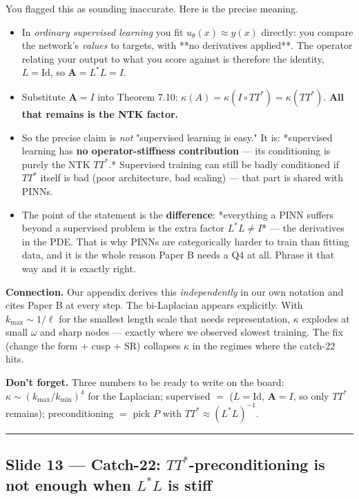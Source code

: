 \documentclass[11pt]{article}
\begin{document}
You flagged this as sounding inaccurate. Here is the precise meaning.

\begin{itemize}
\item In \emph{ordinary supervised learning} you fit $u_\theta(x) \approx y(x)$
directly: you compare the network's \emph{values} to targets, with **no
derivatives applied**. The operator relating your output to what you
score against is therefore the identity, $L = \mathrm{Id}$, so $\mathbf A
  = L^*L = I$.
\item Substitute $\mathbf A = I$ into Theorem 7.10: $\kappa(A) = \kappa(I \circ
  TT^*) = \kappa(TT^*)$. \textbf{All that remains is the NTK factor.}
\item So the precise claim is \emph{not} "supervised learning is easy." It is:
*supervised learning has \textbf{no operator-stiffness contribution} --- its
conditioning is purely the NTK $TT^*$.* Supervised training can still be
badly conditioned if $TT^*$ itself is bad (poor architecture, bad
scaling) --- that part is shared with PINNs.
\item The point of the statement is the \textbf{difference}: *everything a PINN
suffers beyond a supervised problem is the extra factor $L^*L \ne I$* ---
the derivatives in the PDE. That is why PINNs are categorically harder to
train than fitting data, and it is the whole reason Paper B needs a Q4 at
all. Phrase it that way and it is exactly right.
\end{itemize}
\textbf{Connection.} Our appendix derives this \emph{independently} in our own
notation and cites Paper B at every step. The bi-Laplacian appears
explicitly. With $k_{\max} \sim 1/\ell$ for the smallest length scale that
needs representation, $\kappa$ explodes at small $\omega$ and sharp nodes
--- exactly where we observed slowest training. The fix (change the form +
cusp + SR) collapses $\kappa$ in the regimes where the catch-22 hits.

\textbf{Don't forget.} Three numbers to be ready to write on the board: $\kappa
\sim (k_{\max}/k_{\min})^4$ for the Laplacian; supervised $=$ ($L = \mathrm
{Id}$, $\mathbf A = I$, so only $TT^*$ remains); preconditioning $=$ pick
$P$ with $TT^* \approx (L^*L)^{-1}$.

\vspace{4pt}\hrule\vspace{8pt}

\subsection*{Slide 13 --- Catch-22: $TT^*$-preconditioning is not enough when $L^*L$ is stiff}
\end{document}
